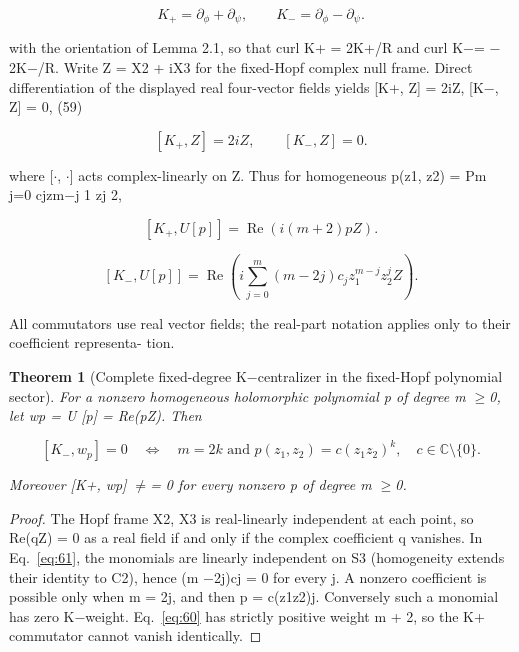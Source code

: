 \documentclass[10pt,letterpaper]{article}
\newtheorem{theorem}{Theorem}[section]
\theoremstyle{remark}
\begin{document}
\begin{equation}
\tag{58}\label{eq:58}
K_+=\partial_\phi+\partial_\psi,\qquad K_-=\partial_\phi-\partial_\psi.
\end{equation}

with the orientation of Lemma 2.1, so that curl K+ = 2K+/R and curl K\(- \)= \(- \)2K\(- \)/R. Write Z = X2 + iX3 for the fixed-Hopf complex null frame. Direct differentiation of the displayed real four-vector fields yields [K+, Z] = 2iZ, [K\(- \), Z] = 0, (59)



\begin{equation}
\tag{59}\label{eq:59}
[K_+,Z]=2iZ,\qquad[K_-,Z]=0.
\end{equation}

where [\(\cdot \), \(\cdot \)] acts complex-linearly on Z. Thus for homogeneous p(z1, z2) = Pm j=0 cjzm\(- \)j 1 zj 2,



\begin{equation}
\tag{60}\label{eq:60}
[K_+,U[p]]=\operatorname{Re}(i(m+2)pZ).
\end{equation}


\begin{equation}
\tag{61}\label{eq:61}
[K_-,U[p]]=\operatorname{Re}\left(i\sum_{j=0}^m(m-2j)c_jz_1^{m-j}z_2^jZ\right).
\end{equation}

All commutators use real vector fields; the real-part notation applies only to their coefficient representa- tion.


\begin{theorem}[Complete fixed-degree K\(- \)centralizer in the fixed-Hopf polynomial sector]

For a nonzero homogeneous holomorphic polynomial p of degree m \(\ge \)0, let wp = U [p] = Re(pZ). Then


\begin{equation}
\tag{62}\label{eq:62}
[K_-,w_p]=0\quad\Longleftrightarrow\quad m=2k\text{ and }p(z_1,z_2)=c(z_1z_2)^k,\quad c\in\mathbb C\setminus\{0\}.
\end{equation}

Moreover [K+, wp] \(\ne \)= 0 for every nonzero p of degree m \(\ge \)0.


\end{theorem}

\begin{proof}
The Hopf frame X2, X3 is real-linearly independent at each point, so Re(qZ) = 0 as a real field if and only if the complex coefficient q vanishes. In Eq.~\eqref{eq:61}, the monomials are linearly independent on S3 (homogeneity extends their identity to C2), hence (m \(- \)2j)cj = 0 for every j. A nonzero coefficient is possible only when m = 2j, and then p = c(z1z2)j. Conversely such a monomial has zero K\(- \)weight. Eq.~\eqref{eq:60} has strictly positive weight m + 2, so the K+ commutator cannot vanish identically.

\end{proof}
\end{document}
